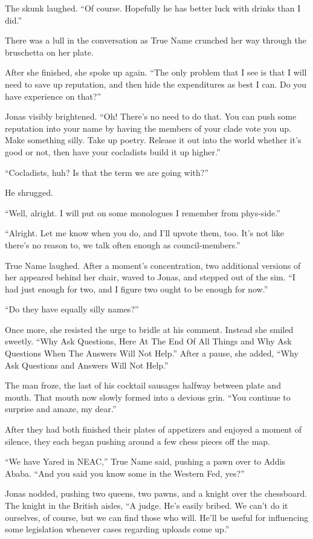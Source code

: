 The skunk laughed. ``Of course. Hopefully he has better luck with drinks than I did.''

There was a lull in the conversation as True Name crunched her way through the bruschetta on her plate.

After she finished, she spoke up again. ``The only problem that I see is that I will need to save up reputation, and then hide the expenditures as best I can. Do you have experience on that?''

Jonas visibly brightened. ``Oh! There's no need to do that. You can push some reputation into your name by having the members of your clade vote you up. Make something silly. Take up poetry. Release it out into the world whether it's good or not, then have your cocladists build it up higher.''

``Cocladists, huh? Is that the term we are going with?''

He shrugged.

``Well, alright. I will put on some monologues I remember from phys-side.''

``Alright. Let me know when you do, and I'll upvote them, too. It's not like there's no reason to, we talk often enough as council-members.''

True Name laughed. After a moment's concentration, two additional versions of her appeared behind her chair, waved to Jonas, and stepped out of the sim. ``I had just enough for two, and I figure two ought to be enough for now.''

``Do they have equally silly names?''

Once more, she resisted the urge to bridle at his comment. Instead she smiled sweetly. ``Why Ask Questions, Here At The End Of All Things and Why Ask Questions When The Answers Will Not Help.'' After a pause, she added, ``Why Ask Questions and Answers Will Not Help.''

The man froze, the last of his cocktail sausages halfway between plate and mouth. That mouth now slowly formed into a devious grin. ``You continue to surprise and amaze, my dear.''

After they had both finished their plates of appetizers and enjoyed a moment of silence, they each began pushing around a few chess pieces off the map.

``We have Yared in NEAC,'' True Name said, pushing a pawn over to Addis Ababa. ``And you said you know some in the Western Fed, yes?''

Jonas nodded, pushing two queens, two pawns, and a knight over the chessboard. The knight in the British aisles, ``A judge. He's easily bribed. We can't do it ourselves, of course, but we can find those who will. He'll be useful for influencing some legislation whenever cases regarding uploads come up.''

